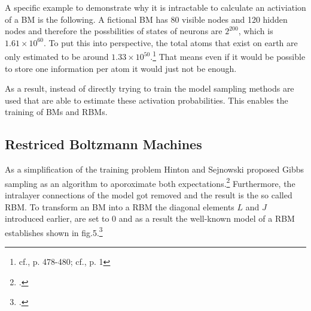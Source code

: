 A specific example to demonstrate why it is intractable to calculate an activiation of a \ac{BM} is the following. A fictional \ac{BM} has 80 visible nodes and 120 hidden nodes and therefore the possbilities of states of neurons are \( 2^{200} \), which is \( 1.61 \times 10^{60}\). 
To put this into perspective, the total atoms that exist on earth are only estimated to be around \( 1.33 \times 10^{50}\).\footnote{cf.\cite{helmenstineHowManyAtoms2022}, p. 478-480; cf.\cite{schlammingerCoolWayMeasure2014}, p. 1}
That means even if it would be possible to store one information per atom it would just not be enough. 

As a result, instead of directly trying to train the model sampling methods are used that are able to estimate these activation probabilities.
This enables the training of \ac{BM}s and \ac{RBM}s.
\subsection{Restriced Boltzmann Machines}

As a simplification of the training problem Hinton and Sejnowski proposed Gibbs sampling as an algorithm to aporoximate both expectations.\footcite[cf.][158-165]{ackleyLearningAlgorithmBoltzmann1985}
Furthermore, the intralayer connections of the model got removed and the result is the so called \ac{RBM}.
To transform an \ac{BM} into a \ac{RBM} the diagonal elements \( L \) and \( J \)  introduced earlier, are set to 0 and as a result the well-known model of a \ac{RBM} establishes shown in fig.5.\footcite[cf.][449]{salakhutdinovDeepBoltzmannMachines2009}

